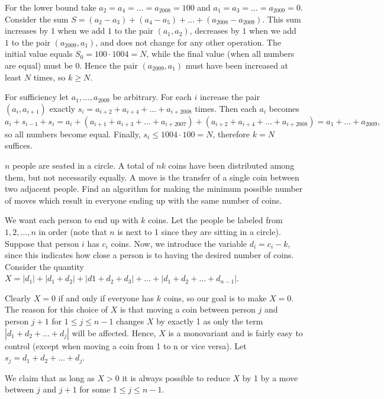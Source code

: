 For the lower bound take $a_2=a_4=\dots=a_{2008}=100$ and $a_1=a_3=\dots=a_{2009}=0$.
Consider the sum $S=(a_2-a_3)+(a_4-a_5)+\dots+(a_{2008}-a_{2009}).$
This sum increases by $1$ when we add $1$ to the pair $(a_1,a_2)$, decreases by $1$ when we add $1$ to the pair $(a_{2009},a_1)$, and does not change for any other operation. The initial value equals $S_0=100\cdot1004=N$, while the final value (when all numbers are equal) must be $0$. Hence the pair $(a_{2009},a_1)$ must have been increased at least $N$ times, so $k\ge N$.

For sufficiency let $a_1,\dots,a_{2009}$ be arbitrary. For each $i$ increase the pair $(a_i,a_{i+1})$ exactly
$s_i=a_{i+2}+a_{i+4}+\dots+a_{i+2008}$ times. Then each $a_i$ becomes
$$ a_i+s_{i-1}+s_i
= a_i+(a_{i+1}+a_{i+3}+\dots+a_{i+2007})+(a_{i+2}+a_{i+4}+\dots+a_{i+2008})
= a_1+\dots+a_{2009},
$$
so all numbers become equal. Finally, $s_i\le 1004\cdot100=N$, therefore $k=N$ suffices.

\begin{example} [APMO 1997]
    $n$ people are seated in a circle. A total of $nk$ coins have been distributed among them, but not necessarily equally. A move is the transfer of a single coin between two adjacent people. Find an algorithm for making the minimum possible number of moves which result in everyone ending up with the same number of coins. 
\end{example}

\sol We want each person to end up with $k$ coins. Let the people be labeled from $1, 2, \dots, n$ in order (note that $n$ is next to 1 since they are sitting in a circle). Suppose that person $i$ has $c_i$ coins. Now, we introduce the variable $d_i = c_i - k$, since this indicates how close a person is to having the desired number of coins. Consider the quantity $X = |d_1| + |d_1 + d_2| + |d1 + d_2 + d_3| + \dots + |d_1 + d_2 + \dots + d_{n-1}|$.

Clearly $X = 0$ if and only if everyone has $k$ coins, so our goal is to make $X = 0$. The reason for this choice of $X$ is that moving a coin between person $j$ and person $j + 1$ for $1 \leq j \leq n-1$ changes $X$ by exactly 1 as only the term $|d_1 + d_2 + \dots + d_j|$ will be affected. Hence, $X$ is a monovariant and is fairly easy to control (except when moving a coin from 1 to n or vice versa). Let $s_j = d_1 + d_2 + \dots + d_j$.

We claim that as long as $X > 0$ it is always possible to reduce $X$ by 1 by a move between $j$ and $j +1$ for some $1 \leq j \leq n -1$.

